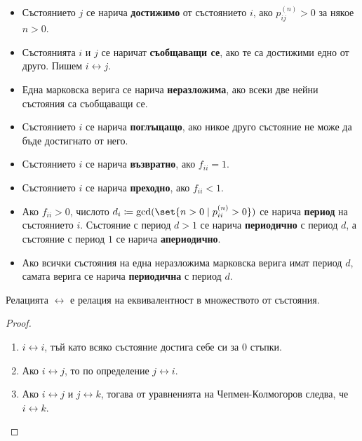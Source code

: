 \documentclass{../../common/topic}
\begin{document}
\begin{definition}
  \hfill
  \begin{itemize}
    \item Състоянието \( j \) се нарича \textbf{достижимо} от състоянието \( i \), ако \( p^{(n)}_{ij} > 0 \) за някое \( n > 0 \).
    \item Състоянията \( i \) и \( j \) се наричат \textbf{съобщаващи се}, ако те са достижими едно от друго. Пишем \( i \leftrightarrow j \).
    \item Една марковска верига се нарича \textbf{неразложима}, ако всеки две нейни състояния са съобщаващи се.
    \item Състоянието \( i \) се нарича \textbf{поглъщащо}, ако никое друго състояние не може да бъде достигнато от него.
    \item Състоянието \( i \) се нарича \textbf{възвратно}, ако \( f_{ii} = 1 \).
    \item Състоянието \( i \) се нарича \textbf{преходно}, ако \( f_{ii} < 1 \).
    \item Ако \( f_{ii} > 0 \), числото \( d_i \coloneqq \gcd (\set{ n > 0 \mid p_{ii}^{(n)} > 0 }) \) се нарича \textbf{период} на състоянието \( i \). Състояние с период \( d > 1 \) се нарича \textbf{периодично} с период \( d \), а състояние с период \( 1 \) се нарича \textbf{апериодично}.
    \item Ако всички състояния на една неразложима марковска верига имат период \( d \), самата верига се нарича \textbf{периодична} с период \( d \).
  \end{itemize}
\end{definition}

\begin{proposition}
  Релацията \( \leftrightarrow \) е релация на еквивалентност в множеството от състояния.
\end{proposition}
\begin{proof}
  \hfill
  \begin{enumerate}
    \item \( i \leftrightarrow i \), тъй като всяко състояние достига себе си за \( 0 \) стъпки.
    \item Ако \( i \leftrightarrow j \), то по определение \( j \leftrightarrow i \).
    \item Ако \( i \leftrightarrow j \) и \( j \leftrightarrow k \), тогава от уравненията на Чепмен-Колмогоров следва, че \( i \leftrightarrow k \).
  \end{enumerate}
\end{proof}
\end{document}
